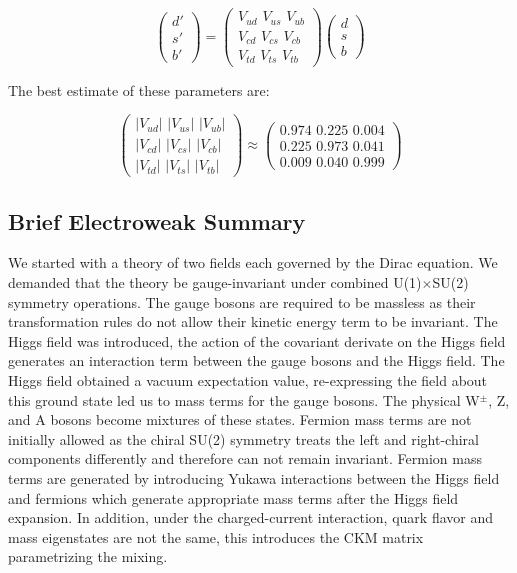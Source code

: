 \begin{equation}
\label{eq:ckmv}
\begin{pmatrix} d' \\ s' \\ b' \end{pmatrix} =
\begin{pmatrix} V_{ud} \,\, V_{us}  \,\, V_{ub} \\ V_{cd} \,\, V_{cs} \,\, V_{cb}  \\ V_{td} \,\, V_{ts} \,\, V_{tb} \end{pmatrix}
\begin{pmatrix} d \\ s \\ b \end{pmatrix}
\end{equation}

The best estimate of these parameters are:

\begin{equation}
\label{eq:ckmval}
\begin{pmatrix} |V_{ud}| \,\, |V_{us}|  \,\, |V_{ub}| \\ |V_{cd}| \,\, |V_{cs}| \,\, |V_{cb}|  \\ |V_{td}| \,\, |V_{ts}| \,\, |V_{tb}| \end{pmatrix} \approx
\begin{pmatrix} 0.974 \,\, 0.225  \,\, 0.004 \\ 0.225 \,\, 0.973 \,\, 0.041  \\ 0.009 \,\, 0.040 \,\, 0.999 \end{pmatrix}
\end{equation}

\subsection{Brief Electroweak Summary}

We started with a theory of two fields each governed by the Dirac equation. We demanded that the theory be gauge-invariant under combined U(1)$\times$SU(2) symmetry operations. The gauge bosons are required to be massless as their transformation rules do not allow their kinetic energy term to be invariant. The Higgs field was introduced, the action of the covariant derivate on the Higgs field generates an interaction term between the gauge bosons and the Higgs field. The Higgs field obtained a vacuum expectation value, re-expressing the field about this ground state led us to mass terms for the gauge bosons. The physical W$^{\pm}$, Z, and A bosons become mixtures of these states. Fermion mass terms are not initially allowed as the chiral SU(2) symmetry treats the left and right-chiral components differently and therefore can not remain invariant. Fermion mass terms are generated by introducing Yukawa interactions between the Higgs field and fermions which generate appropriate mass terms after the Higgs field expansion. In addition, under the charged-current interaction, quark flavor and mass eigenstates are not the same, this introduces the CKM matrix parametrizing the mixing.

